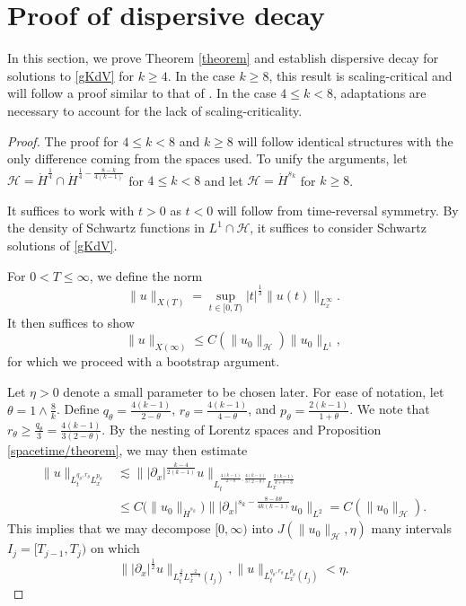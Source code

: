 \documentclass[10pt, reqno]{amsart}
\numberwithin{equation}{section}
\theoremstyle{definition}
\theoremstyle{remark}
\begin{document}
        
\section{Proof of dispersive decay}
In this section, we prove Theorem \ref{theorem} and establish dispersive decay for solutions to \eqref{gKdV} for $k \geq 4$. In the case $k \geq 8$, this result is scaling-critical and will follow a proof similar to that of \cite{FKVZ24,Kowal24}. In the case $4 \leq k < 8$, adaptations are necessary to account for the lack of scaling-criticality.
\begin{proof}
    The proof for $4 \leq k < 8$ and $k \geq 8$ will follow identical structures with the only difference coming from the spaces used. To unify the arguments, let $\mathcal{H} = \dot{H}^{\frac{1}{4}} \cap \dot{H}^{\frac{1}{4} - \frac{8-k}{4(k-1)}}$ for $4 \leq k < 8$ and let $\mathcal{H} = \dot{H}^{s_k}$ for $k \geq 8$.

    It suffices to work with $t > 0$ as $t < 0$ will follow from time-reversal symmetry. By the density of Schwartz functions in $L^1 \cap \mathcal{H}$, it suffices to consider Schwartz solutions of \eqref{gKdV}.

    For $0 < T \leq \infty$, we define the norm
    \begin{equation*}
        \|u\|_{X(T)} = \sup_{t \in [0,T)} |t|^{\frac{1}{3}}\|u(t)\|_{L_x^\infty}.
    \end{equation*}
    It then suffices to show
    \begin{equation}\label{proof/conclusion}
        \|u\|_{X(\infty)} \leq C(\|u_0\|_{\mathcal{H}})\|u_0\|_{L^{1}},
    \end{equation}
    for which we proceed with a bootstrap argument.
    
    Let $\eta > 0$ denote a small parameter to be chosen later. For ease of notation, let $\theta = 1 \wedge \frac{8}{k}$. Define $q_\theta = \frac{4(k-1)}{2-\theta}$, $ r_\theta = \frac{4(k-1)}{4 - \theta}$, and $p_\theta = \frac{2(k-1)}{1 + \theta}$. We note that $r_\theta \geq \frac{q_\theta}{3} = \frac{4(k-1)}{3(2-\theta)}$. By the nesting of Lorentz spaces and Proposition \ref{spacetime/theorem}, we may then estimate
    \begin{align*}
        \|u\|_{L_t^{q_\theta,r_\theta}L_x^{p_\theta}} 
        & \lesssim \Big\||\partial_x|^{\frac{k-4}{2(k-1)}}u \Big\|_{L_t^{\frac{4(k-1)}{2-\theta}, \frac{4(k-1)}{3(2-\theta)}} L_x^{\frac{2(k-1)}{k+\theta-3}}}\\
        & \leq C\big(\|u_0\|_{\dot{H}^{s_k}}\big)\Big\||\partial_x|^{s_k - \frac{8-k\theta}{4k(k-1)}} u_0\Big\|_{L^2} = C(\|u_0\|_{\mathcal{H}}).
    \end{align*}
     This implies that we may decompose $[0,\infty)$ into $J(\|u_0\|_{\mathcal{H}},\eta)$ many intervals $I_j = [T_{j-1},T_j)$ on which
    \begin{equation}\label{proof/smallness}
        \big\||\partial_x|^{\frac{1}{2}}u\big\|_{L_t^\frac{4}{\theta} L_x^\frac{2}{1-\theta}(I_j)}, \|u\|_{L_t^{q_\theta,r_\theta}L_x^{p_\theta}(I_j)} < \eta.
    \end{equation}


\end{proof}
\end{document}
